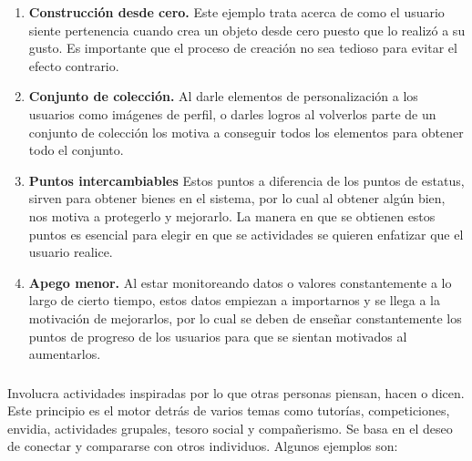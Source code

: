     \begin{enumerate}
        \item \textbf{Construcción desde cero.} \cite[p. 182]{libro2} Este ejemplo trata acerca de como el usuario siente pertenencia cuando crea un objeto desde cero puesto que lo realizó a su gusto. Es importante que el proceso de creación no sea tedioso para evitar el efecto contrario.
        
        \item \textbf{Conjunto de colección.} \cite[p. 183]{libro2} Al darle elementos de personalización a los usuarios como imágenes de perfil, o darles logros al volverlos parte de un conjunto de colección los motiva a conseguir todos los elementos para obtener todo el conjunto.
        
        \item \textbf{Puntos intercambiables} \cite[p. 187]{libro2} Estos puntos a diferencia de los puntos de estatus, sirven para obtener bienes en el sistema, por lo cual al obtener algún bien, nos motiva a protegerlo y mejorarlo. La manera en que se obtienen estos puntos es esencial para elegir en que se actividades se quieren enfatizar que el usuario realice.
        
        \item \textbf{Apego menor.} \cite[p. 189]{libro2} Al estar monitoreando datos o valores constantemente a lo largo de cierto tiempo, estos datos empiezan a importarnos y se llega a la motivación de mejorarlos, por lo cual se deben de enseñar constantemente los puntos de progreso de los usuarios para que se sientan motivados al aumentarlos.

    \end{enumerate}
    
    \subsubsection{\principioV}
    \label{subsec:principioV}
    
    Involucra actividades inspiradas por lo que otras personas piensan, hacen o dicen. Este principio es el motor detrás de varios temas como tutorías, competiciones, envidia, actividades grupales, tesoro social y compañerismo. Se basa en el deseo de conectar y compararse con otros individuos.\cite[p. 197]{libro2} Algunos ejemplos son:
    
